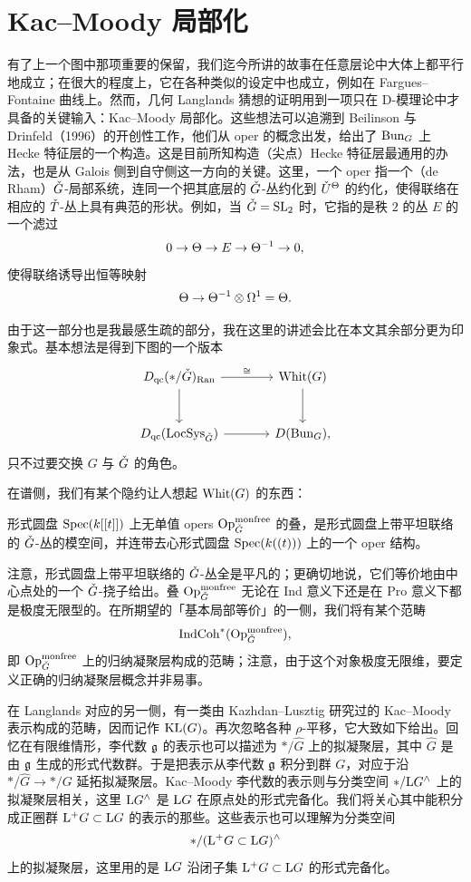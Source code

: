 \section{Kac--Moody 局部化}
\providecommand{\Loc}{\mathrm{Loc}}%
\providecommand{\Poinc}{\mathrm{Poinc}}%

有了上一个图中那项重要的保留，我们迄今所讲的故事在任意层论中大体上都平行地成立；在很大的程度上，它在各种类似的设定中也成立，例如在 Fargues--Fontaine 曲线上。然而，几何 Langlands 猜想的证明用到一项只在 D-模理论中才具备的关键输入：Kac--Moody 局部化。这些想法可以追溯到 Beilinson 与 Drinfeld（1996）的开创性工作，他们从 oper 的概念出发，给出了 $\operatorname{Bun}_G$ 上 Hecke 特征层的一个构造。这是目前所知构造（尖点）Hecke 特征层最通用的办法，也是从 Galois 侧到自守侧这一方向的关键。这里，一个 oper 指一个（de Rham）$\check{G}$-局部系统，连同一个把其底层的 $\check{G}$-丛约化到 $\check{U}^{\Theta}$ 的约化，使得联络在相应的 $\check{T}$-丛上具有典范的形状。例如，当 $\check{G}=\mathrm{SL}_2$ 时，它指的是秩 $2$ 的丛 $E$ 的一个滤过
\[
0\to\Theta\to E\to\Theta^{-1}\to 0,
\]
使得联络诱导出恒等映射
\[
\Theta\to\Theta^{-1}\otimes\Omega^{1}=\Theta.
\]

由于这一部分也是我最感生疏的部分，我在这里的讲述会比在本文其余部分更为印象式。基本想法是得到下图的一个版本
\[
\begin{tikzcd}[column sep=large,row sep=large]
D_{\qc}(*/\Gd)_{\Ran} \arrow[r,"\cong"] \arrow[d] & \Whit(G) \arrow[d] \\
D_{\qc}(\LocSys_{\Gd}) \arrow[r] & D(\Bun_G),
\end{tikzcd}
\]
只不过要交换 $G$ 与 $\check{G}$ 的角色。

在谱侧，我们有某个隐约让人想起 $\operatorname{Whit}(G)$ 的东西：

\begin{definition}
形式圆盘 $\operatorname{Spec}(k[[t]])$ 上无单值 opers $\operatorname{Op}^{\mathrm{monfree}}_{\check{G}}$ 的叠，是形式圆盘上带平坦联络的 $\check{G}$-丛的模空间，并连带去心形式圆盘 $\operatorname{Spec}(k((t)))$ 上的一个 oper 结构。
\end{definition}

注意，形式圆盘上带平坦联络的 $\check{G}$-丛全是平凡的；更确切地说，它们等价地由中心点处的一个 $\check{G}$-挠子给出。叠 $\operatorname{Op}^{\mathrm{monfree}}_{\check{G}}$ 无论在 Ind 意义下还是在 Pro 意义下都是极度无限型的。在所期望的「基本局部等价」的一侧，我们将有某个范畴
\[
\operatorname{IndCoh}^{*}(\operatorname{Op}^{\mathrm{monfree}}_{\check{G}}),
\]
即 $\operatorname{Op}^{\mathrm{monfree}}_{\check{G}}$ 上的归纳凝聚层构成的范畴；注意，由于这个对象极度无限维，要定义正确的归纳凝聚层概念并非易事。

在 Langlands 对应的另一侧，有一类由 Kazhdan--Lusztig 研究过的 Kac--Moody 表示构成的范畴，因而记作 $\operatorname{KL}(G)$。再次忽略各种 $\rho$-平移，它大致如下给出。回忆在有限维情形，李代数 $\mathfrak{g}$ 的表示也可以描述为 $*/\hat{G}$ 上的拟凝聚层，其中 $\hat{G}$ 是由 $\mathfrak{g}$ 生成的形式代数群。于是把表示从李代数 $\mathfrak{g}$ 积分到群 $G$，对应于沿 $*/\hat{G}\to*/G$ 延拓拟凝聚层。Kac--Moody 李代数的表示则与分类空间 $*/\mathrm{L}G^{\wedge}$ 上的拟凝聚层相关，这里 $\mathrm{L}G^{\wedge}$ 是 $\mathrm{L}G$ 在原点处的形式完备化。我们将关心其中能积分成正圈群 $\mathrm{L}^{+}G\subset\mathrm{L}G$ 的表示的那些。这些表示也可以理解为分类空间
\[
*/(\mathrm{L}^{+}G\subset\mathrm{L}G)^{\wedge}
\]
上的拟凝聚层，这里用的是 $\mathrm{L}G$ 沿闭子集 $\mathrm{L}^{+}G\subset\mathrm{L}G$ 的形式完备化。

